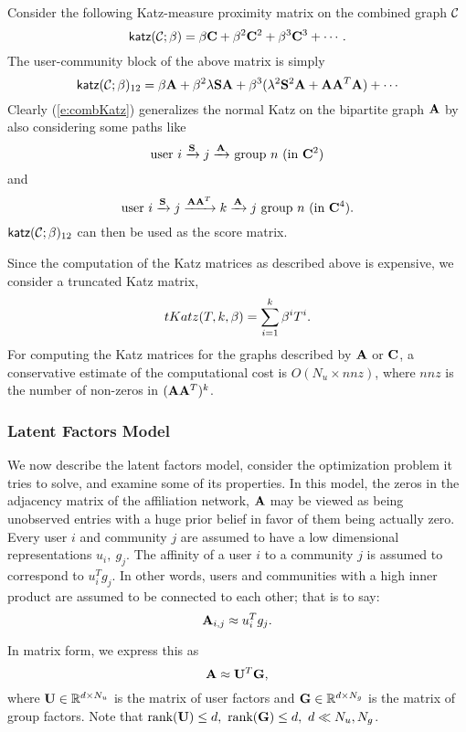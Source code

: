 Consider the following Katz-measure proximity matrix on the combined graph $\mathcal{C}$
\[
\mathsf{katz}(\mathcal{C}; \beta) = \beta \mathbf{C} + \beta^2 \mathbf{C}^2 + \beta^3 \mathbf{C}^3 + \cdots.
\]
The user-community block of the above matrix is simply
\begin{equation}
\mathsf{katz}(\calC; \beta)_{12} = \beta \A + \beta^2 \lambda \SS \A +  \beta^3(\lambda^2 \SS^2 \A + \A \A^T \A) + \cdots
\label{e:combKatz}
\end{equation}
Clearly (\ref{e:combKatz}) generalizes the normal Katz on the bipartite graph $\mathbf{A}$
by also considering some paths like
\[
\text{user $i \xrightarrow{\mathbf{S}}j\xrightarrow{\mathbf{A}}$ group $n$ (in $\mathbf{C}^2$)}
\]
and
\[
\text{user $i \xrightarrow{\mathbf{S}}j\xrightarrow{\mathbf{A}\mathbf{A}^T}k \xrightarrow{\mathbf{A}}j$ group $n$ (in $\mathbf{C}^4$)}.
\]
$\mathsf{katz}(\mathcal{C}; \beta)_{12}$ can then be used as the score matrix.

Since the computation of the Katz matrices as described above is expensive, we consider a truncated Katz matrix, $$tKatz(T, k, \beta) = \sum_{i=1}^{k} \beta^i T^i.$$ For computing the Katz matrices for the graphs described by $\mathbf{A}$ or $\mathbf{C}$, a conservative estimate of the computational cost is $O(N_u \times nnz)$, where $nnz$ is the number of non-zeros in $(\mathbf{A}\mathbf{A}^T)^k$.

\subsubsection{Latent Factors Model}
\label{Latent Factors Model}
We now describe the latent factors model, consider the optimization problem it tries to solve, and examine some of its properties. In this model, the zeros in the adjacency matrix of the affiliation network, $\mathbf{A}$ may be viewed as being unobserved entries with a huge prior belief in favor of them being actually zero. Every user $i$ and community $j$ are assumed to have a low dimensional representations $u_i,\ g_j$. The affinity of a user $i$ to a community $j$ is assumed to correspond to $u_i^{T} g_j$. In other words, users and communities with a high inner product are assumed to be connected to each other; that is to say: $$\mathbf{A}_{i, j} \approx u_i^T g_j.$$

In matrix form, we express this as
$$\mathbf{A} \approx \mathbf{U}^T \mathbf{G},$$
where $\mathbf{U} \in \mathbb{R}^{d \times N_u}$ is the matrix of user factors and $\mathbf{G} \in \mathbb{R}^{d \times N_g}$ is the matrix of group factors. Note that $\text{rank}(\mathbf{U}) \leq d,\ \text{rank}(\mathbf{G}) \leq d,\ d \ll N_u, N_g$.

